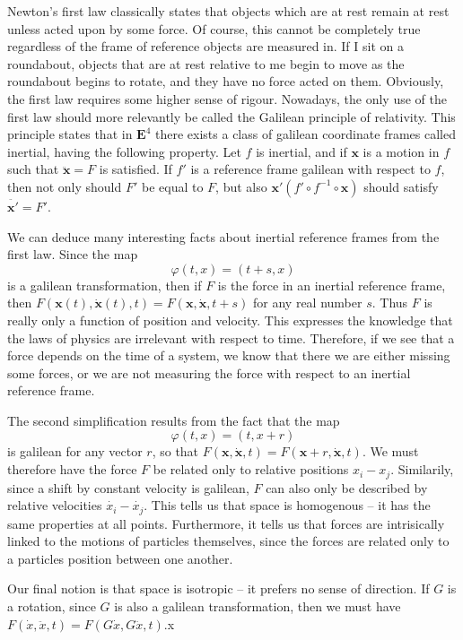 Newton's first law classically states that objects which are at rest remain at rest unless acted upon by some force. Of course, this cannot be completely true regardless of the frame of reference objects are measured in. If I sit on a roundabout, objects that are at rest relative to me begin to move as the roundabout begins to rotate, and they have no force acted on them. Obviously, the first law requires some higher sense of rigour. Nowadays, the only use of the first law should more relevantly be called the Galilean principle of relativity. This principle states that in $\mathbf{E}^4$ there exists a class of galilean coordinate frames called inertial, having the following property. Let $f$ is inertial, and if $\mathbf{x}$ is a motion in $f$ such that $\ddot{\mathbf{x}} = F$ is satisfied. If $f'$ is a reference frame galilean with respect to $f$, then not only should $F'$ be equal to $F$, but also $\mathbf{x}' (f' \circ f^{-1} \circ \mathbf{x})$ should satisfy $\ddot{\mathbf{x}'} = F'$.

We can deduce many interesting facts about inertial reference frames from the first law. Since the map
%
\[ \varphi(t,x) = (t + s,x) \]
%
is a galilean transformation, then if $F$ is the force in an inertial reference frame, then $F(\mathbf{x}(t), \dot{\mathbf{x}}(t), t) = F(\mathbf{x}, \dot{\mathbf{x}}, t + s)$ for any real number $s$. Thus $F$ is really only a function of position and velocity. This expresses the knowledge that the laws of physics are irrelevant with respect to time. Therefore, if we see that a force depends on the time of a system, we know that there we are either missing some forces, or we are not measuring the force with respect to an inertial reference frame.

The second simplification results from the fact that the map
%
\[ \varphi(t,x) = (t,x + r) \]
%
is galilean for any vector $r$, so that $F(\mathbf{x}, \dot{\mathbf{x}}, t) = F(\mathbf{x} + r, \dot{\mathbf{x}}, t)$. We must therefore have the force $F$ be related only to relative positions $x_i - x_j$. Similarily, since a shift by constant velocity is galilean, $F$ can also only be described by relative velocities $\dot{x_i} - \dot{x_j}$. This tells us that space is homogenous -- it has the same properties at all points. Furthermore, it tells us that forces are intrisically linked to the motions of particles themselves, since the forces are related only to a particles position between one another.

Our final notion is that space is isotropic -- it prefers no sense of direction. If $G$ is a rotation, since $G$ is also a galilean transformation, then we must have $F(\dot{x}, \ddot{x}, t) = F(G\dot{x}, G\ddot{x}, t)$.x



